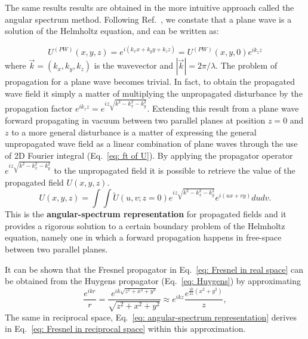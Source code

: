 \documentclass{iucr}              %
\begin{document}
The same results results are obtained in the more intuitive approach called the angular spectrum method. Following Ref.~\cite{paganin_book}, we constate that a plane wave is a solution of the Helmholtz equation, and can be written as: 

\begin{equation}
 U^{(PW)}(x,y,z)=e^{i(k_xx+k_yy+k_zz)} = U^{(PW)}(x,y,0) e^{i k_z z}
\end{equation}
where $\vec{k}=(k_x,k_y,k_z)$ is the wavevector and $|\vec{k}| = 2 \pi / \lambda$. 
The problem of propagation for a plane wave becomes trivial. In fact, to obtain the propagated wave field it simply a matter of multiplying the unpropagated disturbance by the propagation factor $e^{i k_z z} = e^{i z\sqrt{k^2 -k_x^2-k_y^2}}$. Extending this result from a plane wave forward propagating in vacuum between two parallel planes at position $z=0$ and $z$ to a more general disturbance is a matter of expressing the general unpropagated wave field as a linear combination of plane waves through the use of 2D Fourier integral (Eq.~\ref{eq: ft of U}).
By applying the propagator operator $e^{i z\sqrt{k^2 -k_x^2-k_y^2}}$ to the unpropagated field it is possible to retrieve the value of the propagated field $U(x,y,z)$. 
\begin{equation}\label{eq: angular-spectrum representation}
U(x, y, z) = \int \int \widetilde{U}(u,v; z=0) e^{i z\sqrt{k^2 -k_x^2-k_y^2}} e^{i(u x + v y)} du dv.
\end{equation} 
This is the \textbf{angular-spectrum representation} for propagated fields and it provides a rigorous solution to a certain boundary problem of the Helmholtz equation, namely one in which a forward propagation happens in free-space between two parallel planes. 

It can be shown that the Fresnel propagator in Eq.~\ref{eq: Fresnel in real space} can be obtained from the Huygens propagator (Eq.~\ref{eq: Huygens}) by approximating
\begin{equation}
 \frac{e^{i k r}}{r} = \frac{e^{i k \sqrt{z^2 + x^2 + y^2} }} { \sqrt{z^2 + x^2 + y^2} } \approx e^{i k z} \frac{ 
 e^{\frac{i k}{2 z} (x^2 + y^2)} 
 }{z},  
\end{equation}
The same in reciprocal space, Eq.~\ref{eq: angular-spectrum representation} derives in Eq.~\ref{eq: Fresnel in reciprocal space} within this approximation. 
\end{document}
